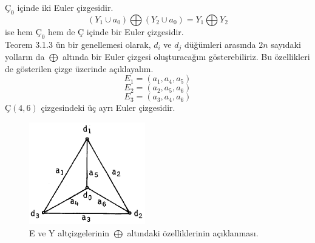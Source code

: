 \documentclass[11pt]{amsbook}
\begin{document}

$Ç_0$ içinde iki Euler çizgesidir. $$ (Y_1 \cup a_0) \bigoplus ( Y_2 \cup a_0) = Y_1 \bigoplus Y_2$$
ise hem $Ç_0$ hem de Ç içinde bir Euler çizgesidir. \\

Teorem 3.1.3 ün bir genellemesi olarak, $d_i$ ve $d_j$ düğümleri arasında $2n$ sayıdaki yolların da $\bigoplus$ altında bir Euler çizgesi oluşturacağını gösterebiliriz. Bu özellikleri  de gösterilen çizge üzerinde açıklayalım.
$$E_1 = (a_1,a_4,a_5)$$
$$E_2 = (a_2,a_5,a_6)$$
$$E_3 = (a_3,a_4,a_6)$$ $Ç(4,6)$ çizgesindeki üç ayrı Euler çizgesidir.

\begin{figure}[htb]
	\centering
	\includegraphics[width=0.45\textwidth]{images/ceyhun-110-fig01}
	\caption{E ve Y altçizgelerinin $\bigoplus$ altındaki özelliklerinin açıklanması.}
	\label{fig:3.1.1}
\end{figure}
\end{document}
